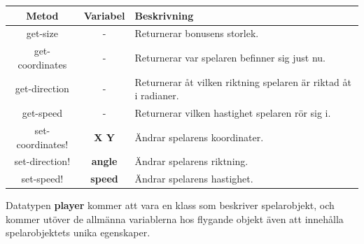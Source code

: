 \documentclass[12pt,a4paper]{article}
\newcounter{subsubsubsection}[subsubsection]
\begin{document}
\begin{tabular}{| c | c | p{8.3cm} |}
	\hline
	\textbf{Metod} & \textbf{Variabel} & \textbf{Beskrivning} \\
	\hline
	 
	 get-size & - & Returnerar bonusens storlek. \\
	 \hline
	 get-coordinates & - & Returnerar var spelaren befinner sig just nu. \\
	 \hline
	 get-direction & - & Returnerar åt vilken riktning spelaren är riktad åt i radianer.\\
	 \hline
	 get-speed & - & Returnerar vilken hastighet spelaren rör sig i.\\
	 \hline
	 set-coordinates! & \small\textbf{X Y} & Ändrar spelarens koordinater. \\
	 \hline
	 set-direction! & \small\textbf{angle} & Ändrar spelarens riktning. \\
	 \hline
	 set-speed! & \small\textbf{speed} & Ändrar spelarens hastighet. \\
	 \hline
\end{tabular}


Datatypen \textbf{player} kommer att vara en klass som beskriver spelarobjekt, och kommer utöver de allmänna variablerna hos flygande objekt även att innehålla spelarobjektets unika egenskaper.

\vspace{0.2cm}
\end{document}
